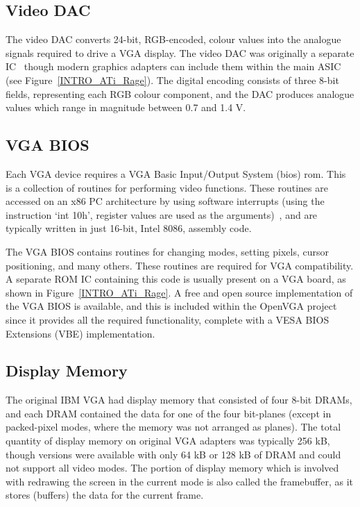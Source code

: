 \subsection{Video DAC}
The video DAC converts 24-bit, RGB-encoded, colour values into the analogue
signals required to drive a VGA display. The video DAC was originally a
separate IC~\cite{VGA_Programmers, SVGA_Book} though modern graphics adapters
can include them within the main ASIC (see Figure~\ref{INTRO_ATi_Rage}). The
digital encoding consists of three 8-bit fields, representing each RGB colour
component, and the DAC produces analogue values which range in magnitude between
0.7 and 1.4 V.


\subsection{VGA BIOS}
Each VGA device requires a VGA Basic Input/Output System (\gls{bios}) \gls{rom}. This is a collection of
routines for performing video functions. These routines are accessed on an x86 PC
architecture by using software interrupts (using the instruction `int 10h',
register values are used as the arguments)~\cite{VGA_Programmers, SVGA_Book}, and
are typically written in just 16-bit, Intel 8086, assembly code.

The VGA BIOS contains routines for changing modes, setting pixels, cursor
positioning, and many others. These routines are required for VGA compatibility.
A separate ROM IC containing this code is usually present on a VGA board, as
shown in Figure~\ref{INTRO_ATi_Rage}. A free and open source implementation of
the VGA BIOS is available, and this is included within the OpenVGA project since
it provides all the required functionality, complete with a VESA BIOS Extensions
(VBE) implementation.


\subsection{Display Memory}
\label{VGA_Display_Memory}
The original IBM VGA had display memory that consisted of four 8-bit DRAMs, and
each DRAM contained the data for one of the four bit-planes (except in
packed-pixel modes, where the memory was not arranged as planes). The total
quantity of display memory on original VGA adapters was typically 256 kB, though
versions were available with only 64 kB or 128 kB of DRAM and could not support
all video modes. The portion of display memory which is involved with redrawing
the screen in the current mode is also called the framebuffer, as it stores
(buffers) the data for the current frame.

